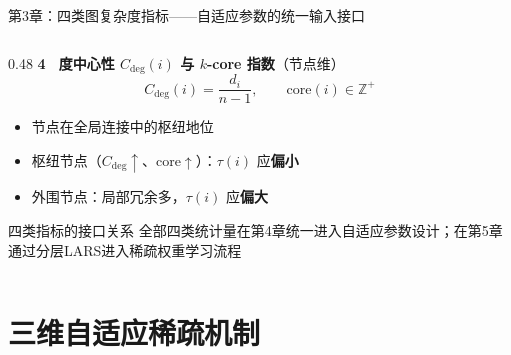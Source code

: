 \documentclass[aspectratio=169,9pt,xcolor=dvipsnames]{beamer}
\newcommand{\blue}[1]{\textcolor{mynavy}{#1}}
\begin{document}
\begin{frame}{第3章：四类图复杂度指标——自适应参数的统一输入接口}
\begin{columns}[T]
\begin{column}{0.48\textwidth}
      \vspace{0.2cm}
      \textbf{\blue{4 \, 度中心性 $C_{\mathrm{deg}}(i)$ 与 $k$-core 指数}}（节点维）
      \begin{equation*}
        C_{\mathrm{deg}}(i)=\frac{d_i}{n-1},\qquad
        \mathrm{core}(i)\in\mathbb{Z}^+
      \end{equation*}
      \begin{itemize}
        \item 节点在全局连接中的枢纽地位
        \item 枢纽节点（$C_{\mathrm{deg}}\uparrow$、$\mathrm{core}\uparrow$）：$\tau(i)$ 应\textbf{偏小}
        \item 外围节点：局部冗余多，$\tau(i)$ 应\textbf{偏大}
      \end{itemize}

      \begin{alertblock}{四类指标的接口关系}
        \small 全部四类统计量在第4章统一进入自适应参数设计；在第5章通过分层LARS进入稀疏权重学习流程
      \end{alertblock}
    \end{column}
  \end{columns}
\end{frame}

\section{三维自适应稀疏机制}
\end{document}
